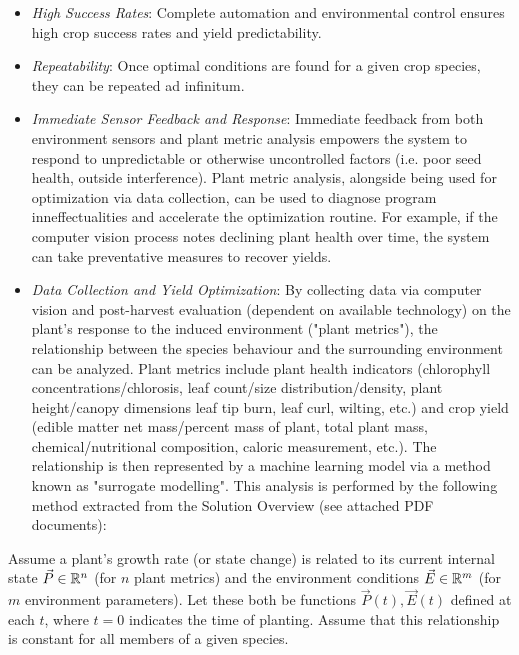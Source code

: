 \documentclass{report}
\begin{document}
\begin{itemize}
    \item \textit{High Success Rates}: Complete automation and environmental control ensures high crop success rates and yield predictability.
    \item \textit{Repeatability}: Once optimal conditions are found for a given crop species, they can be repeated ad infinitum.
    \item \textit{Immediate Sensor Feedback and Response}: Immediate feedback from both environment sensors and plant metric analysis empowers the system to respond to unpredictable or otherwise uncontrolled factors (i.e. poor seed health, outside interference). Plant metric analysis, alongside being used for optimization via data collection, can be used to diagnose program inneffectualities and accelerate the optimization routine. For example, if the computer vision process notes declining plant health over time, the system can take preventative measures to recover yields.
    \item \textit{Data Collection and Yield Optimization}: By collecting data via computer vision and post-harvest evaluation (dependent on available technology) on the plant's response to the induced environment ("plant metrics"), the relationship between the species behaviour and the surrounding environment can be analyzed. Plant metrics include plant health indicators (chlorophyll concentrations/chlorosis, leaf count/size distribution/density, plant height/canopy dimensions leaf tip burn, leaf curl, wilting, etc.) and crop yield (edible matter net mass/percent mass of plant, total plant mass, chemical/nutritional composition, caloric measurement, etc.). The relationship is then represented by a machine learning model via a method known as "surrogate modelling". This analysis is performed by the following method extracted from the Solution Overview (see attached PDF documents):
    
\end{itemize}

Assume a plant's growth rate (or state change) is related to its current internal state $\vec P \in \mathbb R^n$ (for $n$ plant metrics) and the environment conditions $\vec E \in \mathbb R^m$ (for $m$ environment parameters). Let these both be functions $\vec P (t),\vec E(t)$ defined at each $t$, where $t=0$ indicates the time of planting. Assume that this relationship is constant for all members of a given species.

\newpage
\end{document}
